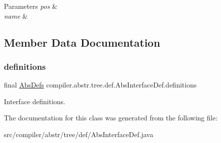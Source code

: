 \begin{DoxyParams}{Parameters}
{\em pos} & \\
\hline
{\em name} & \\
\hline
\end{DoxyParams}


\subsection{Member Data Documentation}
\mbox{\label{classcompiler_1_1abstr_1_1tree_1_1def_1_1_abs_interface_def_a264407486d391f932293c3e96dfc9372}} 
\subsubsection{\texorpdfstring{definitions}{definitions}}
{\footnotesize\ttfamily final \hyperlink{classcompiler_1_1abstr_1_1tree_1_1_abs_defs}{Abs\+Defs} compiler.\+abstr.\+tree.\+def.\+Abs\+Interface\+Def.\+definitions}

Interface definitions. 

The documentation for this class was generated from the following file\+:\begin{DoxyCompactItemize}
\item 
src/compiler/abstr/tree/def/Abs\+Interface\+Def.\+java\end{DoxyCompactItemize}
